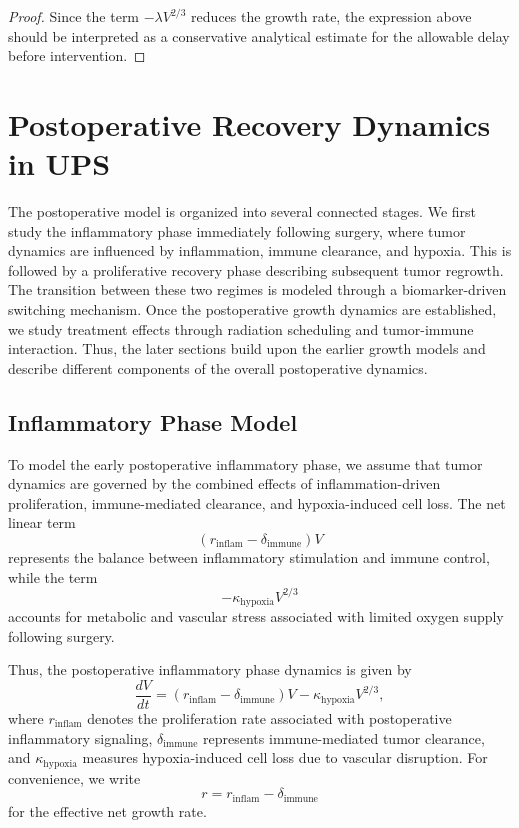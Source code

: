 \documentclass[11pt, reqno]{amsart}
\numberwithin{equation}{section}
\theoremstyle{definition}
\begin{document}
\begin{proof}
Since the term $-\lambda V^{2/3}$ reduces the growth rate, the expression above should be interpreted as a conservative analytical estimate for the allowable delay before intervention.
\end{proof}


\section{Postoperative Recovery Dynamics in UPS}

The postoperative model is organized into several connected stages. We first study the inflammatory phase immediately following surgery, where tumor dynamics are influenced by inflammation, immune clearance, and hypoxia. This is followed by a proliferative recovery phase describing subsequent tumor regrowth. The transition between these two regimes is modeled through a biomarker-driven switching mechanism. Once the postoperative growth dynamics are established, we study treatment effects through radiation scheduling and tumor-immune interaction. Thus, the later sections build upon the earlier growth models and describe different components of the overall postoperative dynamics.


\subsection{Inflammatory Phase Model}

To model the early postoperative inflammatory phase, we assume that tumor dynamics are governed by the combined effects of inflammation-driven proliferation, immune-mediated clearance, and hypoxia-induced cell loss. The net linear term
\[
(r_{\mathrm{inflam}}-\delta_{\mathrm{immune}})V
\]
represents the balance between inflammatory stimulation and immune control, while the term
\[
-\kappa_{\mathrm{hypoxia}}V^{2/3}
\]
accounts for metabolic and vascular stress associated with limited oxygen supply following surgery.

Thus, the postoperative inflammatory phase dynamics is given by
\begin{equation}\label{inflam}
\frac{dV}{dt} = (r_{\text{inflam}} - \delta_{\text{immune}}) V - \kappa_{\text{hypoxia}} V^{2/3},
\end{equation}
where $r_{\text{inflam}}$ denotes the proliferation rate associated with postoperative inflammatory signaling, $\delta_{\text{immune}}$ represents immune-mediated tumor clearance, and $\kappa_{\text{hypoxia}}$ measures hypoxia-induced cell loss due to vascular disruption. For convenience, we write
\[
r=r_{\text{inflam}}-\delta_{\text{immune}}
\]
for the effective net growth rate.
\end{document}
